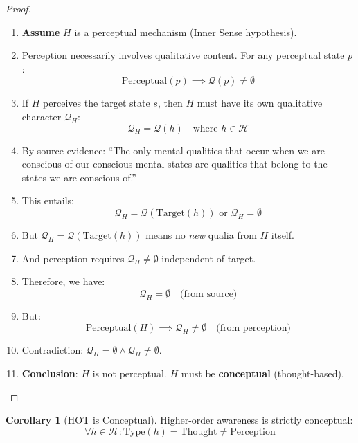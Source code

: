 \documentclass[11pt,a4paper]{article}
\theoremstyle{definition}
\newtheorem{corollary}{Corollary}[section]
\theoremstyle{remark}
\newcommand{\Q}{\mathcal{Q}}
\newcommand{\Hset}{\mathcal{H}}
\newcommand{\Target}{\text{Target}}
\begin{document}
\begin{proof}
\begin{enumerate}
    \item \textbf{Assume} $H$ is a perceptual mechanism (Inner Sense hypothesis).
    \item Perception necessarily involves qualitative content. For any perceptual state $p$:
    \begin{equation}
    \text{Perceptual}(p) \implies \Q(p) \neq \emptyset
    \end{equation}
    \item If $H$ perceives the target state $s$, then $H$ must have its own qualitative character $\Q_H$:
    \begin{equation}
    \Q_H = \Q(h) \quad \text{where } h \in \Hset
    \end{equation}
    \item By source evidence: ``The only mental qualities that occur when we are conscious of our conscious mental states are qualities that belong to the states we are conscious of.''
    \item This entails:
    \begin{equation}
    \Q_H = \Q(\Target(h)) \text{ or } \Q_H = \emptyset
    \end{equation}
    \item But $\Q_H = \Q(\Target(h))$ means no \textit{new} qualia from $H$ itself.
    \item And perception requires $\Q_H \neq \emptyset$ independent of target.
    \item Therefore, we have:
    \begin{equation}
    \Q_H = \emptyset \quad \text{(from source)}
    \end{equation}
    \item But:
    \begin{equation}
    \text{Perceptual}(H) \implies \Q_H \neq \emptyset \quad \text{(from perception)}
    \end{equation}
    \item Contradiction: $\Q_H = \emptyset \land \Q_H \neq \emptyset$.
    \item \textbf{Conclusion}: $H$ is not perceptual. $H$ must be \textbf{conceptual} (thought-based). \qedhere
\end{enumerate}
\end{proof}

\begin{corollary}[HOT is Conceptual]
\label{cor:conceptual}
Higher-order awareness is strictly conceptual:
\begin{equation}
\forall h \in \Hset : \text{Type}(h) = \text{Thought} \neq \text{Perception}
\end{equation}
\end{corollary}
\end{document}
